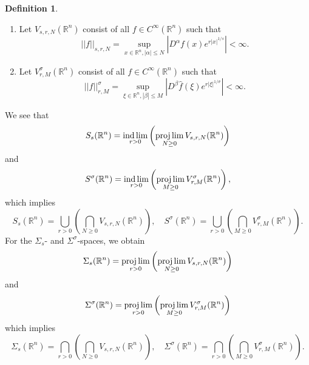 \documentclass[11pt,a4paper,reqno]{amsart}
\numberwithin{equation}{section}
\theoremstyle{definition}
\theoremstyle{definition}
\newtheorem{definition}[thm]{Definition}
\DeclareMathOperator*{\indlim}{ind\,lim}
\begin{document}
\begin{definition}\label{def:top}
\begin{enumerate}
    \item Let $V_{s,r,N}(\mathbb{R}^n)$ consist of all $f\in C^\infty(\mathbb{R}^n)$ such that
 \begin{equation*}
     ||f||_{s,r,N}= \sup_{x\in\mathbb{R}^n, |\alpha|\leq N} \left|D^\alpha f(x)e^{r|x|^{1/s}}\right| < \infty.
 \end{equation*}
 \item Let $V_{r,M}^\sigma(\mathbb{R}^n)$ consist of all $f\in C^\infty(\mathbb{R}^n)$ such that
\begin{equation*}
     ||f||_{r,M}^\sigma= \sup_{\xi\in\mathbb{R}^n, |\beta|\leq M} \left| D^\beta \hat{f}(\xi)e^{r|\xi|^{1/\sigma}}\right| < \infty.
\end{equation*}
\end{enumerate}
\end{definition}
We see that
\begin{equation*}
    S_s(\mathbb{R}^n) = \indlim_{r>0}\left(\projlim_{N\geq 0} V_{s,r,N}(\mathbb{R}^n) \right)
\end{equation*}
and
\begin{equation*}
    S^\sigma(\mathbb{R}^n) = \indlim_{r>0}\left(\projlim_{M\geq 0} V_{r,M}^\sigma(\mathbb{R}^n) \right),
\end{equation*}
which implies
\begin{equation*}
    S_s(\mathbb{R}^n) = \bigcup_{r>0}\left(\bigcap_{N\geq 0} V_{s,r,N}(\mathbb{R}^n) \right),\quad S^\sigma(\mathbb{R}^n) = \bigcup_{r>0}\left(\bigcap_{M\geq 0} V_{r,M}^\sigma(\mathbb{R}^n) \right).
\end{equation*}
For the $\Sigma_s$- and $\Sigma^\sigma$-spaces, we obtain
\begin{equation*}
    \Sigma_s(\mathbb{R}^n) = \projlim_{r>0}\left(\projlim_{N\geq 0} V_{s,r,N}(\mathbb{R}^n) \right)
\end{equation*}
and
\begin{equation*}
    \Sigma^\sigma(\mathbb{R}^n) = \projlim_{r>0}\left(\projlim_{M\geq 0} V_{r,M}^\sigma(\mathbb{R}^n) \right)
\end{equation*}
which implies
\begin{equation*}
    \Sigma_s(\mathbb{R}^n) = \bigcap_{r>0}\left(\bigcap_{N\geq 0} V_{s,r,N}(\mathbb{R}^n) \right),\quad  \Sigma^\sigma(\mathbb{R}^n) = \bigcap_{r>0}\left(\bigcap_{M\geq 0} V_{r,M}^\sigma(\mathbb{R}^n) \right).
\end{equation*}
\end{document}
